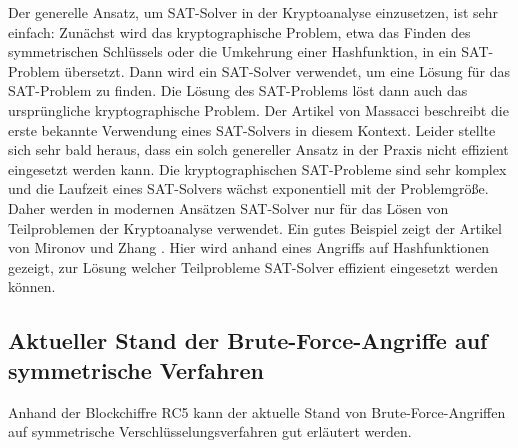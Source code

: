 \begin{refsegment}
Der generelle Ansatz, um SAT-Solver in der Kryptoanalyse einzusetzen, ist sehr einfach: Zunächst wird das kryptographische Problem, etwa das Finden des symmetrischen Schlüssels oder die Umkehrung einer Hashfunktion, in ein SAT-Problem übersetzt. Dann wird ein SAT-Solver verwendet, um eine Lösung für das SAT-Problem zu finden. Die Lösung des SAT-Problems löst dann auch das ursprüngliche kryptographische Problem.
Der Artikel von Massacci \cite{Massacci2000} beschreibt die erste bekannte Verwendung eines SAT-Solvers in diesem Kontext. Leider stellte sich sehr bald heraus, dass ein solch genereller Ansatz in der Praxis nicht effizient eingesetzt werden kann. Die kryptographischen SAT-Probleme sind sehr komplex und die Laufzeit eines SAT-Solvers wächst exponentiell mit der Problemgröße. Daher werden in modernen Ansätzen SAT-Solver nur für das Lösen von Teilproblemen der Kryptoanalyse verwendet. Ein gutes Beispiel zeigt der Artikel von Mironov und Zhang \cite{Mironov2006}. Hier wird anhand eines Angriffs auf Hashfunktionen gezeigt, zur Lösung welcher Teilprobleme SAT-Solver effizient eingesetzt werden können.





\subsection{Aktueller Stand der Brute-Force-Angriffe auf symmetrische Verfahren}
\label{cm_Brute-force-versus-Symmetr}

Anhand der Blockchiffre RC5 kann der aktuelle Stand von Brute-Force-Angriffen
auf symmetrische Verschlüsselungsverfahren gut erläutert werden.


\end{refsegment}
